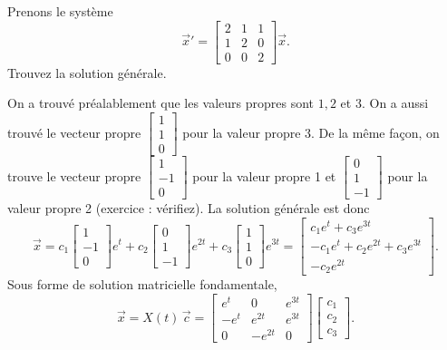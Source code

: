 \begin{example}
Prenons le système
\begin{equation*}
{\vec{x}}'
=
\begin{bmatrix}
2 & 1 & 1 \\
1 & 2 & 0 \\
0 & 0 & 2
\end{bmatrix}
\vec{x} .
\end{equation*}
Trouvez la solution générale.

On a trouvé préalablement que les valeurs propres sont $1,2$ et $3$.  On a aussi trouvé le vecteur propre
$\left[ \begin{smallmatrix} 1 \\ 1 \\ 0 \end{smallmatrix} \right]$
pour la valeur propre 3. De la même façon, on trouve le vecteur propre 
$\left[ \begin{smallmatrix} 1 \\ -1 \\ 0 \end{smallmatrix} \right]$
pour la valeur propre 1 et 
$\left[ \begin{smallmatrix} 0 \\ 1 \\ -1 \end{smallmatrix} \right]$
pour la valeur propre 2 (exercice : vérifiez). La solution générale est donc
\begin{equation*}
\vec{x} =
c_1
\begin{bmatrix}
1 \\ -1 \\ 0
\end{bmatrix}
e^t
+
c_2
\begin{bmatrix}
0 \\ 1 \\ -1
\end{bmatrix}
e^{2t}
+
c_3
\begin{bmatrix}
1 \\ 1 \\ 0
\end{bmatrix}
e^{3t} 
=
\begin{bmatrix}
c_1 e^t+c_3 e^{3t} \\ -c_1 e^t + c_2 e^{2t} + c_3 e^{3t} \\ - c_2 e^{2t}
\end{bmatrix} .
\end{equation*}
Sous forme de solution matricielle fondamentale,
\begin{equation*}
\vec{x} = X(t)\, \vec{c}
=
\begin{bmatrix}
e^t & 0 & e^{3t} \\
-e^t & e^{2t} & e^{3t} \\
0 & -e^{2t} & 0
\end{bmatrix}
\begin{bmatrix}
c_1 \\ c_2 \\ c_3
\end{bmatrix} .
\end{equation*}
\end{example}

